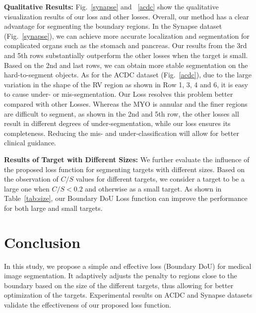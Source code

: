 \documentclass[runningheads]{llncs}
\begin{document}
\noindent\textbf{Qualitative Results:} Fig.~\ref{synapse} and ~\ref{acdc} show the qualitative visualization results of our loss and other losses. Overall, our method has a clear advantage for segmenting the boundary regions. In the Synapse dataset (Fig.~\ref{synapse}), we can achieve more accurate localization and segmentation for complicated organs such as the stomach and pancreas. Our results from the 3rd and 5th rows substantially outperform the other losses when the target is small. Based on the 2nd and last rows, we can obtain more stable segmentation on the hard-to-segment objects. As for the ACDC dataset (Fig.~\ref{acdc}), due to the large variation in the shape of the RV region as shown in Row 1, 3, 4 and 6, it is easy to cause under- or mis-segmentation. Our Loss resolves this problem better compared with other Losses. Whereas the MYO is annular and the finer regions are difficult to segment, as shown in the 2nd and 5th row, the other losses all result in different degrees of under-segmentation, while our loss ensures its completeness. Reducing the mis- and under-classification will allow for better clinical guidance.
 



\noindent\textbf{Results of Target with Different Sizes:} 
We further evaluate the influence of the proposed loss function for segmenting targets with different sizes. Based on the observation of $C/S$ values for different targets, we consider a target to be a large one when $C/S < 0.2$ and otherwise as a small target. As shown in Table~\ref{tab:size}, our Boundary DoU Loss function can improve the performance for both large and small targets. 


\section{Conclusion}
\label{sec:conlusion}
In this study, we propose a simple and effective loss (Boundary DoU) for medical image segmentation. It adaptively adjusts the penalty to regions close to the boundary based on the size of the different targets, thus allowing for better optimization of the targets. Experimental results on ACDC and Synapse datasets validate the effectiveness of our proposed loss function. 
\end{document}

